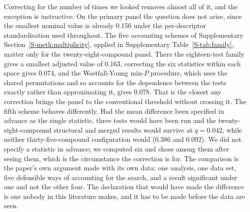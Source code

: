 \documentclass[1p,times]{elsarticle}
\begin{document}
Correcting for the number of times we looked removes almost all of it, and the
exception is instructive. On the primary panel the question does not arise,
since the smallest nominal value is already 0.156 under the per-descriptor
standardisation used throughout. The five accounting schemes of Supplementary
Section~\ref{S-meth:multiplicity}, applied in Supplementary
Table~\ref{S-tab:family}, matter only for the twenty-eight-compound panel. There the eighteen-test family
gives a smallest adjusted value of 0.163, correcting the six statistics within
each space gives 0.074, and the Westfall-Young min-$P$ procedure, which uses the
shared permutations and so accounts for the dependence between the tests exactly
rather than approximating it, gives 0.078. That is the closest any correction
brings the panel to the conventional threshold without crossing it. The fifth
scheme behaves differently. Had the mean difference been specified in advance as
the single statistic, three tests would have been run and the
twenty-eight-compound structural and merged results would survive at $q=0.042$,
while neither thirty-five-compound configuration would (0.386 and 0.092). We did
not specify a statistic in advance; we computed six and chose among them after
seeing them, which is the circumstance the correction is for. The comparison is
the paper's own argument made with its own data: one analysis, one data set,
five defensible ways of accounting for the search, and a result significant under
one and not the other four. The declaration that would have made the difference
is one nobody in this literature makes, and it has to be made before the data
are seen.
\end{document}
